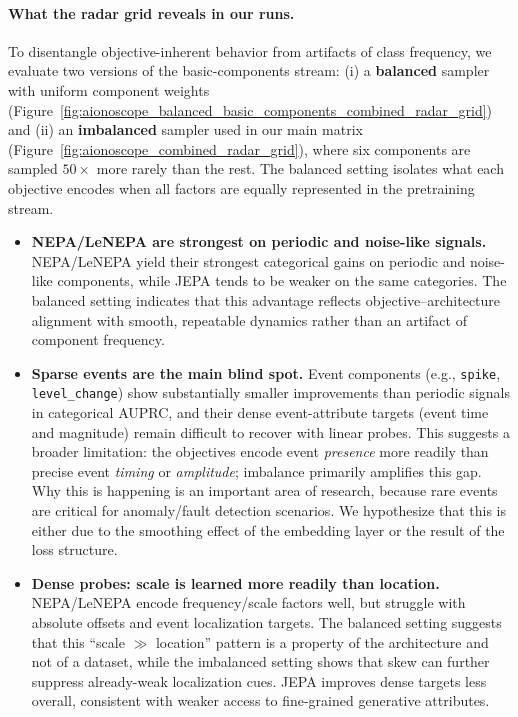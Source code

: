 \paragraph{What the radar grid reveals in our runs.}
To disentangle objective-inherent behavior from artifacts of class frequency, we evaluate two versions of the basic-components stream: (i) a \textbf{balanced} sampler with uniform component weights (Figure~\ref{fig:aionoscope_balanced_basic_components_combined_radar_grid}) and (ii) an \textbf{imbalanced} sampler used in our main matrix (Figure~\ref{fig:aionoscope_combined_radar_grid}), where six components are sampled $50\times$ more rarely than the rest.
The balanced setting isolates what each objective encodes when all factors are equally represented in the pretraining stream.

\begin{itemize}
  \item \textbf{NEPA/LeNEPA are strongest on periodic and noise-like signals.} NEPA/LeNEPA yield their strongest categorical gains on periodic and noise-like components, while JEPA tends to be weaker on the same categories. The balanced setting indicates that this advantage reflects objective--architecture alignment with smooth, repeatable dynamics rather than an artifact of component frequency.
  \item \textbf{Sparse events are the main blind spot.} Event components (e.g., \texttt{spike}, \texttt{level\_change}) show substantially smaller improvements than periodic signals in categorical AUPRC, and their dense event-attribute targets (event time and magnitude) remain difficult to recover with linear probes. This suggests a broader limitation: the objectives encode event \emph{presence} more readily than precise event \emph{timing} or \emph{amplitude}; imbalance primarily amplifies this gap. Why this is happening is an important area of research, because rare events are critical for anomaly/fault detection scenarios. We hypothesize that this is either due to the smoothing effect of the embedding layer or the result of the loss structure.
  \item \textbf{Dense probes: scale is learned more readily than location.} NEPA/LeNEPA encode frequency/scale factors well, but struggle with absolute offsets and event localization targets. The balanced setting suggests that this ``scale $\gg$ location'' pattern is a property of the architecture and not of a dataset, while the imbalanced setting shows that skew can further suppress already-weak localization cues. JEPA improves dense targets less overall, consistent with weaker access to fine-grained generative attributes.

\end{itemize}
